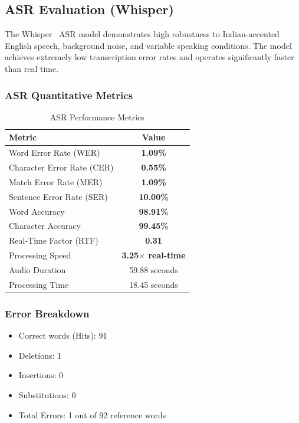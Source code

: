 \documentclass[12pt,oneside]{report}
\begin{document}
\subsection{ASR Evaluation (Whisper)}

The Whisper~\cite{radford2023whisper} ASR model demonstrates high robustness to Indian-accented English speech, background noise, and variable speaking conditions. The model achieves extremely low transcription error rates and operates significantly faster than real time.

\subsubsection*{ASR Quantitative Metrics}

\begin{table}[H]
\centering
\caption{ASR Performance Metrics}
\label{tab:asr-results}
\begin{tabular}{@{}lc@{}}
\toprule
\textbf{Metric} & \textbf{Value} \\
\midrule
Word Error Rate (WER) & \textbf{1.09\%} \\
Character Error Rate (CER) & \textbf{0.55\%} \\
Match Error Rate (MER) & \textbf{1.09\%} \\
Sentence Error Rate (SER) & \textbf{10.00\%} \\
Word Accuracy & \textbf{98.91\%} \\
Character Accuracy & \textbf{99.45\%} \\
Real-Time Factor (RTF) & \textbf{0.31} \\
Processing Speed & \textbf{3.25$\times$ real-time} \\
Audio Duration & 59.88 seconds \\
Processing Time & 18.45 seconds \\
\bottomrule
\end{tabular}
\end{table}

\subsubsection*{Error Breakdown}
\begin{itemize}
    \item Correct words (Hits): 91
    \item Deletions: 1  
    \item Insertions: 0  
    \item Substitutions: 0  
    \item Total Errors: 1 out of 92 reference words
\end{itemize}
\end{document}
